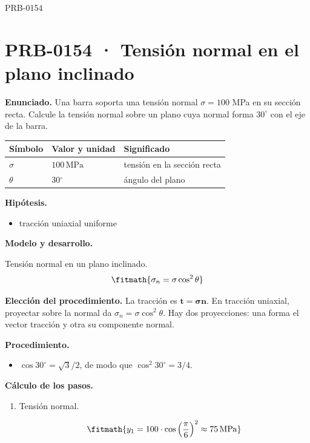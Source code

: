 \begin{studiumworked}{PRB-0154}

\section{PRB-0154 · Tensión normal en el plano inclinado}

\textbf{Enunciado.} Una barra soporta una tensión normal $\sigma = 100$ MPa en su sección recta. Calcule la tensión normal sobre un plano cuya normal forma $30^{\circ}$ con el eje de la barra.

\par\medskip\noindent\begin{tabular}{@{}p{.18\linewidth}p{.26\linewidth}p{.48\linewidth}@{}}
\toprule Símbolo & Valor y unidad & Significado\\\midrule
$\sigma$ & $100\,\mathrm{MPa}$ & tensión en la sección recta\\
$\theta$ & $30{}^{\circ}$ & ángulo del plano\\
\bottomrule\end{tabular}\par\medskip

\textbf{Hipótesis.}\begin{itemize}\item tracción uniaxial uniforme\end{itemize}

\textbf{Modelo y desarrollo.}

Tensión normal en un plano inclinado.\[\fitmath{\sigma_n = \sigma\cos^{2}\theta}\]

\textbf{Elección del procedimiento.} La tracción es $\boldsymbol t=\boldsymbol\sigma\boldsymbol n$. En tracción uniaxial, proyectar sobre la normal da $\sigma_n=\sigma\cos^2\theta$. Hay dos proyecciones: una forma el vector tracción y otra su componente normal.

\textbf{Procedimiento.}\begin{itemize}\item $\cos 30^{\circ} = \sqrt3/2$, de modo que $\cos^2 30^{\circ} = 3/4$.\end{itemize}

\textbf{Cálculo de los pasos.}

\begin{enumerate}

\item Tensión normal.

\[\fitmath{y_{1}=100\cdot {\cos\left(\frac{\pi}{6}\right)}^{2}\approx 75\,\mathrm{MPa}}\]


\end{enumerate}
\end{studiumworked}
